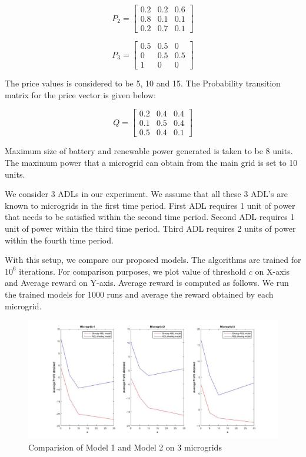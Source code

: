 \[
P_{2}=
\begin{bmatrix}
0.2 & 0.2 & 0.6 \\
0.8 & 0.1 & 0.1 \\
0.2 & 0.7 & 0.1
\end{bmatrix}
\]

\[
P_{3}=
\begin{bmatrix}
0.5 & 0.5 & 0 \\
0 & 0.5 & 0.5 \\
1 & 0 & 0
\end{bmatrix}
\]




The price values is considered to be 5, 10 and 15. The Probability transition matrix for the price vector is given below:



\[
Q=
\begin{bmatrix}
0.2 & 0.4 & 0.4 \\
0.1 & 0.5 & 0.4 \\
0.5 & 0.4 & 0.1
\end{bmatrix}
\]


Maximum size of battery and renewable power generated is taken to be 8 units. The maximum power that a microgrid can obtain from the main grid is set to 10 units.

We consider 3 ADLs in our experiment. We assume that all these 3 ADL's are known to microgrids in the first time period. First ADL requires 1 unit of power that needs to be satisfied within the second time period. Second ADL requires 1 unit of power within the third time period. Third ADL requires 2 units of power within the fourth time period.

With this setup, we compare our proposed models. The algorithms are trained for $10^6$ iterations. For comparison purposes, we plot value of threshold $c$ on X-axis and Average reward on Y-axis. Average reward is computed as follows. We run the trained models for 1000 runs and average the reward obtained by each microgrid. 

\begin{figure}[thbp] \label{r1}
	\centering
	\includegraphics[scale = 0.2]{result_2.jpg}
	\caption{Comparision of Model 1 and Model 2  on 3 microgrids}
\end{figure}

